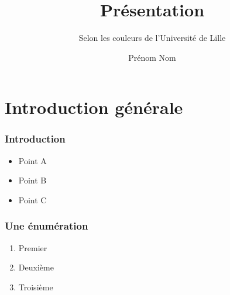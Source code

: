 \documentclass[svgnames,12pt,aspectratio=149]{beamer}
\author{Prénom Nom}
\title{Présentation}
\subtitle{Selon les couleurs de l'Université de Lille}
\begin{document}
\begin{frame}[plain]
  \titlepage
\end{frame}

\section{Introduction générale}
\begin{frame}
  \frametitle{Introduction}

  \begin{itemize}
  \item Point A
  \item Point B
  \item Point C
  \end{itemize}
\end{frame}

\begin{frame}
  \frametitle{Une énumération}

  \begin{enumerate}
  \item Premier
  \item Deuxième
  \item Troisième
  \end{enumerate}
\end{frame}
\end{document}
